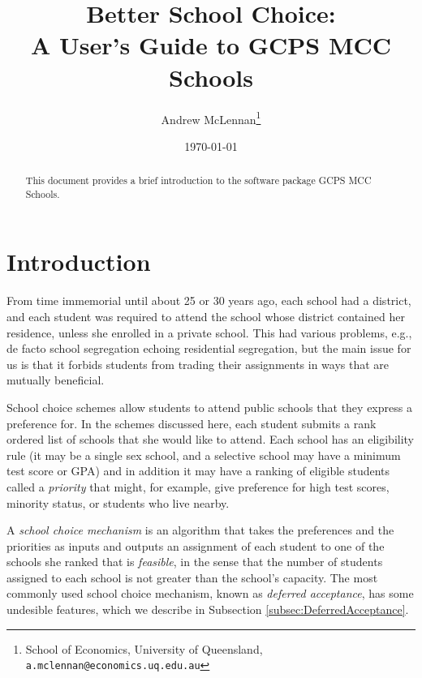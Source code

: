 \documentclass[12pt]{article}
\theoremstyle{definition}
\begin{document}
\title{Better School Choice: \\A User's Guide to GCPS MCC Schools}

\author{Andrew McLennan\footnote{School of Economics, University of
    Queensland, {\tt a.mclennan@economics.uq.edu.au}}}

\date{\today}

\maketitle

\begin{abstract}
This document provides a brief introduction to the software package GCPS MCC Schools.
\end{abstract}


\section{Introduction}

From time immemorial until about 25 or 30 years ago, each school had a
district, and each student was required to attend the school whose
district contained her residence, unless she enrolled in a private
school.  This had various problems, e.g., de facto school segregation
echoing residential segregation, but the main issue for us is that it
forbids students from trading their assignments in ways that are
mutually beneficial.

School choice schemes allow students to attend public schools that
they express a preference for.  In the schemes discussed here, each
student submits a rank ordered list of schools that she would like to
attend.  Each school has an eligibility rule (it may be a single sex
school, and a selective school may have a minimum test score or GPA)
and in addition it may have a ranking of eligible students called a
\emph{priority} that might, for example, give preference for high test
scores, minority status, or students who live nearby.

A \emph{school choice mechanism} is an algorithm that takes the
preferences and the priorities as inputs and outputs an assignment of
each student to one of the schools she ranked that is \emph{feasible},
in the sense that the number of students assigned to each school is
not greater than the school's capacity.  The most commonly used school
choice mechanism, known as \emph{deferred acceptance}, has some
undesible features, which we describe in Subsection
\ref{subsec:DeferredAcceptance}.
\end{document}
